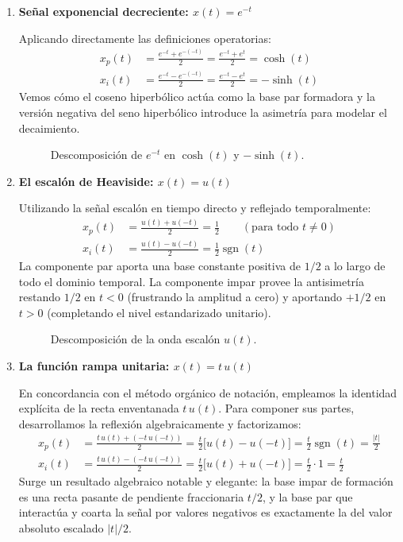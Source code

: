 \documentclass[10pt,a4paper]{article}
\begin{document}
	\begin{enumerate}[label=\textbf{\alph*)}]
		\item \textbf{Señal exponencial decreciente: $x(t) = e^{-t}$}
		
		Aplicando directamente las definiciones operatorias:
		\begin{align*}
		    x_p(t) &= \frac{e^{-t} + e^{-(-t)}}{2} = \frac{e^{-t} + e^t}{2} = \cosh(t) \\
		    x_i(t) &= \frac{e^{-t} - e^{-(-t)}}{2} = \frac{e^{-t} - e^t}{2} = -\sinh(t)
		\end{align*}
		Vemos cómo el coseno hiperbólico actúa como la base par formadora y la versión negativa del seno hiperbólico introduce la asimetría para modelar el decaimiento.
		
		\begin{figure}[H]
			\centering
			
			\caption{Descomposición de $e^{-t}$ en $\cosh(t)$ y $-\sinh(t)$.}
		\end{figure}

		\item \textbf{El escalón de Heaviside: $x(t) = u(t)$}
		
		Utilizando la señal escalón en tiempo directo y reflejado temporalmente:
		\begin{align*}
		    x_p(t) &= \frac{u(t) + u(-t)}{2} = \frac{1}{2} \qquad (\text{para todo } t \neq 0)\\
		    x_i(t) &= \frac{u(t) - u(-t)}{2} = \frac{1}{2}\operatorname{sgn}(t)
		\end{align*}
		La componente par aporta una base constante positiva de $1/2$ a lo largo de todo el dominio temporal. La componente impar provee la antisimetría restando $1/2$ en $t < 0$ (frustrando la amplitud a cero) y aportando $+1/2$ en $t > 0$ (completando el nivel estandarizado unitario).
		
		\begin{figure}[H]
			\centering
			
			\caption{Descomposición de la onda escalón $u(t)$.}
		\end{figure}

		\item \textbf{La función rampa unitaria: $x(t) = t\,u(t)$}
		
		En concordancia con el método orgánico de notación, empleamos la identidad explícita de la recta enventanada $t\,u(t)$. 
		Para componer sus partes, desarrollamos la reflexión algebraicamente y factorizamos:
		\begin{align*}
		    x_p(t) &= \frac{t\,u(t) + (-t\,u(-t))}{2} = \frac{t}{2} \bigl[ u(t) - u(-t) \bigr] = \frac{t}{2}\operatorname{sgn}(t) = \frac{|t|}{2} \\
		    x_i(t) &= \frac{t\,u(t) - (-t\,u(-t))}{2} = \frac{t}{2} \bigl[ u(t) + u(-t) \bigr] = \frac{t}{2} \cdot 1 = \frac{t}{2}
		\end{align*}
		Surge un resultado algebraico notable y elegante: la base impar de formación es una recta pasante de pendiente fraccionaria $t/2$, y la base par que interactúa y coarta la señal por valores negativos es exactamente la del valor absoluto escalado $|t|/2$.


\end{enumerate}
\end{document}

